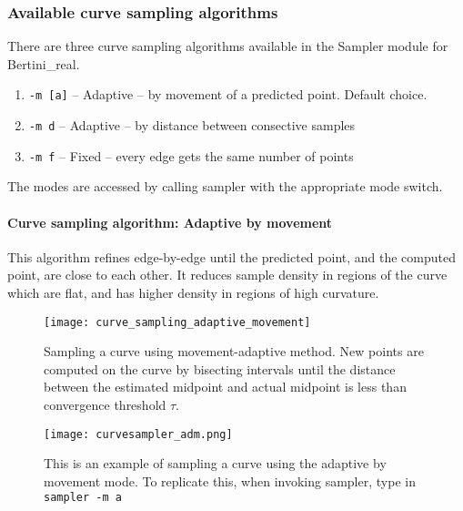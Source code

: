  	\subsubsection{Available curve sampling algorithms}
 	

 	There are three curve sampling algorithms available in the Sampler module for Bertini\_real.

 	\begin{enumerate}

 		\item {\tt -m [a]} -- Adaptive -- by movement of a predicted point.  Default choice.

 		\item {\tt -m d} -- Adaptive -- by distance between consective samples

 		\item {\tt -m f} -- Fixed -- every edge gets the same number of points

 	\end{enumerate}

The modes are accessed by calling sampler with the appropriate mode switch.


\paragraph{Curve sampling algorithm: Adaptive by movement}

This algorithm refines edge-by-edge until the predicted point, and the computed point, are close to each other.  It reduces sample density in regions of the curve which are flat, and has higher density in regions of high curvature.


\begin{figure}[H]
\begin{center}
\texttt{[image: curve\_sampling\_adaptive\_movement]}
\caption[Adaptive-movement curve sampling]{Sampling a curve using movement-adaptive method.  New points are computed on the curve by bisecting intervals until the distance between the estimated midpoint and actual midpoint is less than convergence threshold $\tau$.}
\end{center}
\end{figure}
 
\begin{figure}[H]
\centering
\texttt{[image: curvesampler\_adm.png]}
\caption{This is an example of sampling a curve using the adaptive by movement mode. To replicate this, when invoking sampler, type in {\tt sampler -m a}}
\end{figure}


